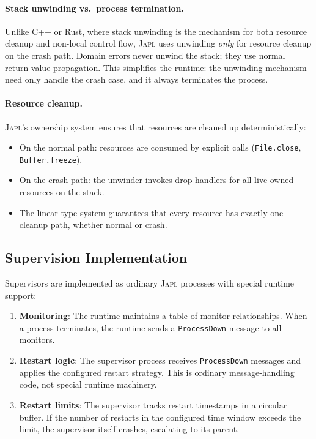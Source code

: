 \documentclass[11pt,twocolumn]{article}
\newcommand{\japl}{\textsc{Japl}}
\begin{document}
\paragraph{Stack unwinding vs.\ process termination.} Unlike C++ or Rust, where stack unwinding is the mechanism for both resource cleanup and non-local control flow, \japl{} uses unwinding \emph{only} for resource cleanup on the crash path. Domain errors never unwind the stack; they use normal return-value propagation. This simplifies the runtime: the unwinding mechanism need only handle the crash case, and it always terminates the process.

\paragraph{Resource cleanup.} \japl{}'s ownership system ensures that resources are cleaned up deterministically:

\begin{itemize}[leftmargin=*]
  \item On the normal path: resources are consumed by explicit calls (\texttt{File.close}, \texttt{Buffer.freeze}).
  \item On the crash path: the unwinder invokes drop handlers for all live owned resources on the stack.
  \item The linear type system guarantees that every resource has exactly one cleanup path, whether normal or crash.
\end{itemize}

\subsection{Supervision Implementation}

Supervisors are implemented as ordinary \japl{} processes with special runtime support:

\begin{enumerate}[leftmargin=*]
  \item \textbf{Monitoring}: The runtime maintains a table of monitor relationships. When a process terminates, the runtime sends a \texttt{ProcessDown} message to all monitors.

  \item \textbf{Restart logic}: The supervisor process receives \texttt{ProcessDown} messages and applies the configured restart strategy. This is ordinary message-handling code, not special runtime machinery.

  \item \textbf{Restart limits}: The supervisor tracks restart timestamps in a circular buffer. If the number of restarts in the configured time window exceeds the limit, the supervisor itself crashes, escalating to its parent.
\end{enumerate}
\end{document}
